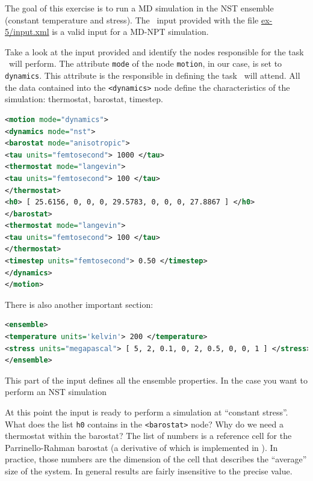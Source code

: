 \documentclass{article}
\begin{document}
\begin{Exercise}[label={inputs},title={Variable cell simulation of ice}]
  The goal of this exercise is to run a MD simulation in the NST
  ensemble (constant temperature and stress). The \ipi\ input provided
  with the file \url{ex-5/input.xml} is a valid input for a
  MD-NPT simulation. 

\Question 
Take a look at the input provided and identify the nodes
responsible for the task \ipi\ will perform.  The attribute
\texttt{mode} of the node \texttt{motion}, in our case, is set to
\texttt{dynamics}. This attribute is the responsible in defining the
task \ipi\ will attend. All the data contained into the
\texttt{<dynamics>} node define the characteristics of the simulation: thermostat, barostat, timestep. 
\begin{lstlisting}[language=xml]
<motion mode="dynamics">
<dynamics mode="nst">
<barostat mode="anisotropic">
<tau units="femtosecond"> 1000 </tau>
<thermostat mode="langevin">
<tau units="femtosecond"> 100 </tau>
</thermostat>
<h0> [ 25.6156, 0, 0, 0, 29.5783, 0, 0, 0, 27.8867 ] </h0>
</barostat>
<thermostat mode="langevin">
<tau units="femtosecond"> 100 </tau>
</thermostat>
<timestep units="femtosecond"> 0.50 </timestep>
</dynamics>
</motion>
\end{lstlisting}

There is also another important section:
\begin{lstlisting}[language=xml]
<ensemble>
<temperature units='kelvin'> 200 </temperature>
<stress units="megapascal"> [ 5, 2, 0.1, 0, 2, 0.5, 0, 0, 1 ] </stress>
</ensemble>
\end{lstlisting}
This part of the input defines all the ensemble properties. In the
case you want to perform an NST simulation

\Question 
At this point the input is ready to perform a simulation at
``constant stress''. What does the list \texttt{h0} contains in the \texttt{<barostat>}
node? Why do we need a thermostat 
within the barostat? The list of numbers is a reference cell for the Parrinello-Rahman
barostat (a derivative of which is implemented in \ipi). In practice, those
numbers are the dimension of the cell that describes the ``average'' size
of the system. In general results are fairly insensitive to the precise value. 

\end{Exercise}



\end{document}
